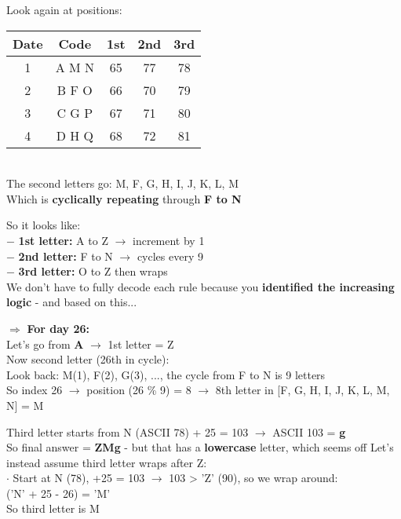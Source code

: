 \documentclass[fleqn]{article}
\newcommand{\problemAnswer}[1]{%
\begin{tcolorbox}[
  colback=gray!10!white,
  title=,
  listing only,
  listing options={style=mypython}
]
\large
#1 %
\end{tcolorbox}
}
\begin{document}
\problemAnswer{
Look again at positions:
\vspace*{0.3cm} \\
\begin{tabular}{|c||c|c|c|c|}
\hline
 Date & Code  & 1st & 2nd & 3rd \\ \hline
 1    & A M N & 65  & 77  & 78  \\ 
 2    & B F O & 66  & 70  & 79  \\ 
 3    & C G P & 67  & 71  & 80  \\ 
 4    & D H Q & 68  & 72  & 81  \\ \hline
\end{tabular}
\vspace*{0.2cm} \\
The second letters go: M, F, G, H, I, J, K, L, M \\
Which is \textbf{cyclically repeating} through \textbf{F to N}
\vspace*{0.2cm}

So it looks like: \\
$-$ \textbf{1st letter:} A to Z $\rightarrow$ increment by 1 \\
$-$ \textbf{2nd letter:} F to N $\rightarrow$ cycles every 9 \\
$-$ \textbf{3rd letter:} O to Z then wraps
\vspace*{0.1cm} \\
We don’t have to fully decode each rule because you \textbf{identified the increasing logic} - and based on this...
\vspace*{0.4cm}

$\Rightarrow$ \textbf{For day 26:} 
\vspace*{0.2cm} \\
Let’s go from \textbf{A} $\rightarrow$ 1st letter = \colorbox{gray!20}{Z} \\
Now second letter (26th in cycle): \\
Look back: M(1), F(2), G(3), ..., the cycle from F to N is 9 letters \\
So index 26 $\rightarrow$ position (26 \% 9) = 8 $\rightarrow$ 8th letter in [F, G, H, I, J, K, L, M, N] = \colorbox{gray!20}{M}
\vspace*{0.2cm}

Third letter starts from N (ASCII 78) + 25 = 103 $\rightarrow$ ASCII 103 = \textbf{g} 
\vspace*{0.2cm} \\
So final answer = \textbf{ZMg} - but that has a \textbf{lowercase} letter, which seems off
Let’s instead assume third letter wraps after Z: \\
$\cdot$ Start at N (78), +25 = 103 $\rightarrow$ 103 > 'Z' (90), so we wrap around: \\
\hspace*{11pt} ('N' + 25 - 26) = 'M' \\
So third letter is \colorbox{gray!20}{M}
}
\end{document}
